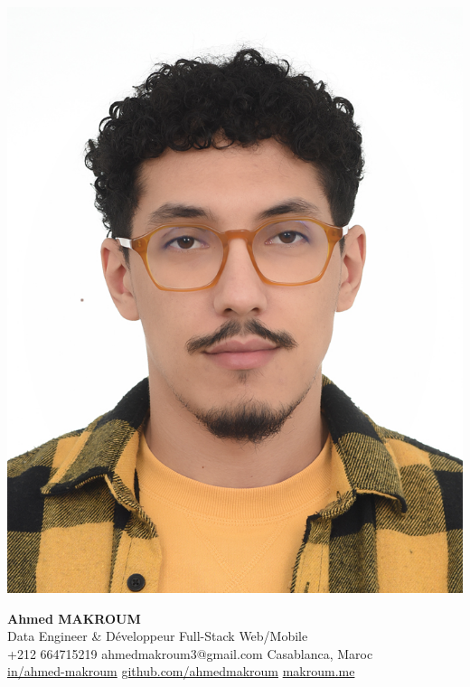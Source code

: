\documentclass[10pt,a4paper,sans]{moderncv}
\begin{document}
\hspace*{0.03\textwidth}%
\begin{minipage}[c]{0.13\textwidth}
  \includegraphics[width=0.85\linewidth]{images/ahmed.jpg}
\end{minipage}%
\hfill
\begin{minipage}[c]{0.84\textwidth}
  \begin{center}
    {\fontsize{20}{22}\selectfont\textbf{Ahmed MAKROUM}}\\[0.7em]
    {\fontsize{13.2}{15.4}\selectfont Data Engineer \& Développeur Full-Stack Web/Mobile} \\[0.5em] %
    {\fontsize{10.5}{12.3}\selectfont
      \faMobile\enspace +212 664715219 \quad
      \faEnvelope\enspace ahmedmakroum3@gmail.com \quad
      \faHome\enspace Casablanca, Maroc \\
      \faLinkedin\enspace \href{https://www.linkedin.com/in/ahmed-makroum/}{in/ahmed-makroum} \quad
      \faGithub\enspace \href{https://github.com/ahmedmakroum}{github.com/ahmedmakroum}
      \faGlobe\enspace \href{https://ahmedmakroum.github.io/AhmedMakroumPortfolio/}{makroum.me}
    }\\[1em]
  \end{center}
\end{minipage}
\vspace{-14pt}
\end{document}
